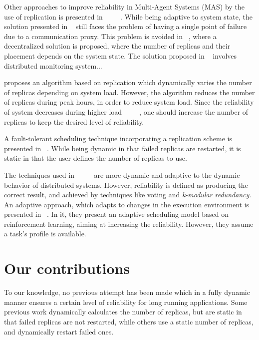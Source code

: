 \documentclass{cslthse-msc}
\begin{document}
Other approaches to improve reliability in Multi-Agent Systems (MAS) by the use of replication is presented in ~\cite{replicatingAgents} ~\cite{adaptiveMASReplication} ~\cite{adaptiveAgentReplication}. While being adaptive to system state, the solution presented in ~\cite{replicatingAgents} still faces the problem of having a single point of failure due to a communication proxy. This problem is avoided in ~\cite{adaptiveMASReplication}, where a decentralized solution is proposed, where the number of replicas and their placement depends on the system state. %
The solution proposed in ~\cite{adaptiveAgentReplication} involves distributed monitoring system...  %

\cite{adaptiveCheckPointAndRep} proposes an algorithm based on replication which dynamically varies the number of replicas depending on system load. However, the algorithm reduces the number of replicas during peak hours, in order to reduce system load. Since the reliability of system decreases during higher load ~\cite{studyOfFailures} ~\cite{studyOfFailures} ~\cite{implicationsOfFailures}, one should increase the number of replicas to keep the desired level of reliability.

A fault-tolerant scheduling technique incorporating a replication scheme is presented in ~\cite{faultTolerantSchedPolicy}. While being dynamic in that failed replicas are restarted, it is static in that the user defines the number of replicas to use.

The techniques used in ~\cite{selfAdaptRel} ~\cite{dynAdaptRepl} ~\cite{relModelWebServices} are more dynamic and adaptive to the dynamic behavior of distributed systems. However, reliability is defined as producing the correct result, and achieved by techniques like voting and \emph{k-modular redundancy}.
An adaptive approach, which adapts to changes in the execution environment is presented in ~\cite{imprRelAdaptRL}. In it, they present an adaptive scheduling model based on reinforcement learning, aiming at increasing the reliability. However, they assume a task's profile is available.


\section{Our contributions} \label{sec:introduction_contributions}
To our knowledge, no previous attempt has been made which in a fully dynamic manner ensures a certain level of reliability for long running applications. Some previous work dynamically calculates the number of replicas, but are static in that failed replicas are not restarted, while others use a static number of replicas, and dynamically restart failed ones.
\end{document}
